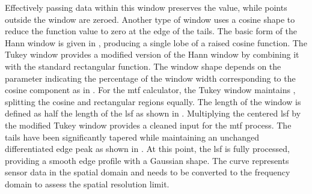 \documentclass[../../../../main.tex]{subfiles}
\begin{document}
    Effectively passing data within this window preserves the value, while points outside the window are zeroed.    
    Another type of window uses a cosine shape to reduce the function value to zero at the edge of the tails.
    The basic form of the Hann window is given in , producing a single lobe of a raised cosine function.
    The Tukey window provides a modified version of the Hann window by combining it with the standard rectangular function.
    The window shape depends on the parameter \Xvariable{\alpha} indicating the percentage of the window width corresponding to the cosine component as in .
    For the \gls{mtf} calculator, the Tukey window maintains , splitting the cosine and rectangular regions equally.
    The length of the window is defined as half the length of the \gls{lsf} as shown in .
    Multiplying the centered \gls{lsf} by the modified Tukey window provides a cleaned input for the \gls{mtf} process.
    The tails have been significantly tapered while maintaining an unchanged differentiated edge peak as shown in .
    At this point, the \gls{lsf} is fully processed, providing a smooth edge profile with a Gaussian shape.
    The curve represents sensor data in the spatial domain and needs to be converted to the frequency domain to assess the spatial resolution limit.
\end{document}
